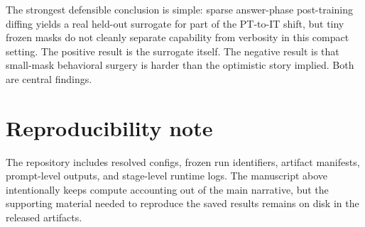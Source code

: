 \documentclass[11pt]{article}
\begin{document}
The strongest defensible conclusion is simple: sparse answer-phase post-training diffing yields a real held-out surrogate for part of the PT-to-IT shift, but tiny frozen masks do not cleanly separate capability from verbosity in this compact setting. The positive result is the surrogate itself. The negative result is that small-mask behavioral surgery is harder than the optimistic story implied. Both are central findings.

\appendix

\section{Reproducibility note}

The repository includes resolved configs, frozen run identifiers, artifact manifests, prompt-level outputs, and stage-level runtime logs. The manuscript above intentionally keeps compute accounting out of the main narrative, but the supporting material needed to reproduce the saved results remains on disk in the released artifacts.



\end{document}
